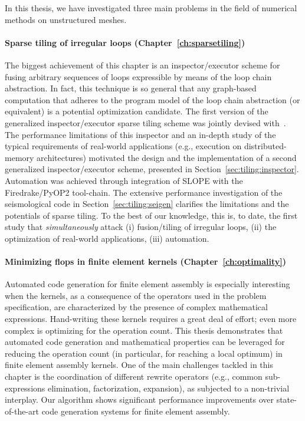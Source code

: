 In this thesis, we have investigated three main problems in the field of numerical methods on unstructured meshes.

\paragraph{Sparse tiling of irregular loops (Chapter~\ref{ch:sparsetiling})} The biggest achievement of this chapter is an inspector/executor scheme for fusing arbitrary sequences of loops expressible by means of the loop chain abstraction. In fact, this technique is so general that any graph-based computation that adheres to the program model of the loop chain abstraction (or equivalent) is a potential optimization candidate. The first version of the generalized inspector/executor sparse tiling scheme was jointly devised with~\cite{st-paper}. The performance limitations of this inspector and an in-depth study of the typical requirements of real-world applications (e.g., execution on distributed-memory architectures) motivated the design and the implementation of a second generalized inspector/executor scheme, presented in Section~\ref{sec:tiling:inspector}. Automation was achieved through integration of SLOPE with the Firedrake/PyOP2 tool-chain. The extensive performance investigation of the seismological code in Section~\ref{sec:tiling:seigen} clarifies the limitations and the potentials of sparse tiling. To the best of our knowledge, this is, to date, the first study that {\it simultaneously} attack (i) fusion/tiling of irregular loops, (ii) the optimization of real-world applications, (iii) automation.

\paragraph{Minimizing flops in finite element kernels (Chapter~\ref{ch:optimality})} Automated code generation for finite element assembly is especially interesting when the kernels, as a consequence of the operators used in the problem specification, are characterized by the presence of complex mathematical expressions. Hand-writing these kernels requires a great deal of effort; even more complex is optimizing for the operation count. This thesis demonstrates that automated code generation and mathematical properties  can be leveraged for reducing the operation count (in particular, for reaching a local optimum) in finite element assembly kernels. One of the main challenges tackled in this chapter is the coordination of different rewrite operators (e.g., common sub-expressions elimination, factorization, expansion), as subjected to a non-trivial interplay. Our algorithm shows significant performance improvements over state-of-the-art code generation systems for finite element assembly. 

